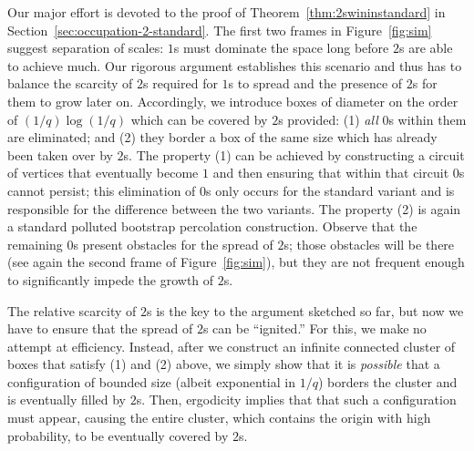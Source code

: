 \documentclass{article}
\numberwithin{equation}{section}
\begin{document}
       Our major effort 
       is devoted to the proof of Theorem~\ref{thm:2swininstandard} in Section~\ref{sec:occupation-2-standard}. The first two frames in Figure~\ref{fig:sim} suggest
       separation of scales: $1$s must dominate the 
       space long before $2$s are able to achieve much. 
       Our rigorous argument establishes this scenario and thus has to balance the scarcity of $2$s required for $1$s to spread and the presence of $2$s for them 
       to grow later on. Accordingly, we introduce boxes 
       of diameter on the order of $(1/q)\log(1/q)$ which can be covered 
       by $2$s provided: (1) {\it all\/} $0$s within them are eliminated; and (2) they border a box of the same size which has already been taken over by $2$s. The property (1) can be achieved by 
       constructing a circuit of vertices that eventually become $1$ 
       and then ensuring that within that circuit $0$s cannot persist; this elimination of 0s only occurs for the standard variant and is responsible for the difference between the two variants. The property 
       (2) is again a standard polluted bootstrap percolation construction. 
       Observe that the remaining $0$s present obstacles for the spread of $2$s; those obstacles will be there (see again the second frame of Figure~\ref{fig:sim}), but they are not frequent enough to significantly impede
       the growth of $2$s. 

       The relative scarcity of $2$s is the key to the argument sketched 
       so far, but now we have to ensure that the spread of $2$s can be 
       ``ignited.'' For this, we make no attempt at efficiency. Instead, 
       after we construct an infinite connected cluster of boxes that 
       satisfy (1) and (2) above, we simply show 
       that it is {\it possible\/} that a configuration of bounded size
       (albeit exponential in $1/q$)
       borders the cluster and is eventually filled 
       by $2$s. Then, ergodicity 
       implies that that such a configuration must appear, causing the 
       entire cluster, which contains the origin with high probability, 
       to be eventually covered by $2$s.
\end{document}
